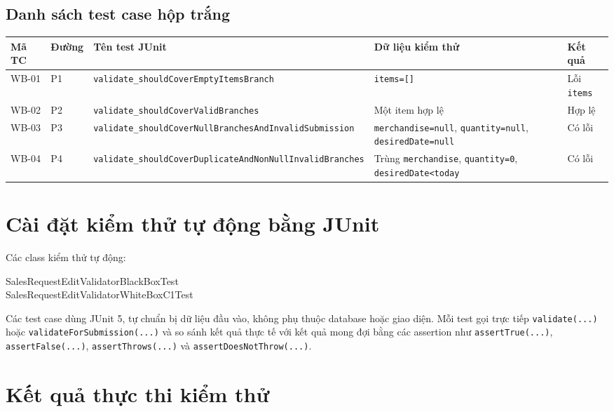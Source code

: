 \documentclass[12pt,a4paper]{article}
\newcommand{\code}[1]{\texttt{#1}}
\newcommand{\mcode}[1]{\texttt{#1}}
\begin{document}
\subsection{Danh sách test case hộp trắng}

\begin{longtable}{p{}p{}p{}p{}p{}}
\toprule
\textbf{Mã TC} & \textbf{Đường} & \textbf{Tên test JUnit} & \textbf{Dữ liệu kiểm thử} & \textbf{Kết quả}\\
\midrule
WB-01 & P1 & \mcode{validate\_shouldCoverEmptyItemsBranch} & \code{items=[]} & Lỗi \code{items}\\
WB-02 & P2 & \mcode{validate\_shouldCoverValidBranches} & Một item hợp lệ & Hợp lệ\\
WB-03 & P3 & \mcode{validate\_shouldCoverNullBranchesAndInvalidSubmission} & \code{merchandise=null}, \code{quantity=null}, \code{desiredDate=null} & Có lỗi\\
WB-04 & P4 & \mcode{validate\_shouldCoverDuplicateAndNonNullInvalidBranches} & Trùng \code{merchandise}, \code{quantity=0}, \code{desiredDate<today} & Có lỗi\\
\bottomrule
\end{longtable}

\section{Cài đặt kiểm thử tự động bằng JUnit}

Các class kiểm thử tự động:
\begin{tcolorbox}[colback=softgray,colframe=linegray,sharp corners]
\begin{minipage}{0.92\textwidth}\ttfamily\small
SalesRequestEditValidatorBlackBoxTest\\
SalesRequestEditValidatorWhiteBoxC1Test
\end{minipage}
\end{tcolorbox}

Các test case dùng JUnit 5, tự chuẩn bị dữ liệu đầu vào, không phụ thuộc database hoặc giao diện. Mỗi test gọi trực tiếp \code{validate(...)} hoặc \code{validateForSubmission(...)} và so sánh kết quả thực tế với kết quả mong đợi bằng các assertion như \code{assertTrue(...)}, \code{assertFalse(...)}, \code{assertThrows(...)} và \code{assertDoesNotThrow(...)}.

\section{Kết quả thực thi kiểm thử}
\end{document}
